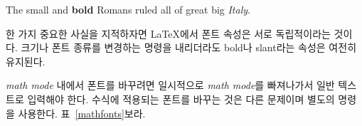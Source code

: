 
\begin{example}
{\small The small and
\textbf{bold} Romans ruled}
{\Large all of great big
\textit{Italy}.}
\end{example}

한 가지 중요한 사실을 지적하자면 \LaTeX 에서 폰트 속성은 서로 독립적이라는 것이다.
크기나 폰트 종류를 변경하는 명령을 내리더라도 bold나 slant라는 속성은 여전히 유지된다.%

\emph{math mode} 내에서 폰트를 바꾸려면 일시적으로 \emph{math mode}를 빠져나가서 일반 텍스트로 입력해야 한다. 수식에 적용되는 폰트를 바꾸는 것은 다른 문제이며 별도의 명령을 사용한다. 표~\ref{mathfonts}\를 보라.


